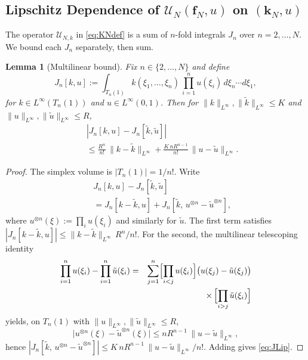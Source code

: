 \documentclass[10pt,a4paper]{amsart}
\newcommand{\Linf}{L^\infty}
\newtheorem{lemma}{Lemma}
\begin{document}
\subsection{Lipschitz Dependence of $\mathcal{U}_N(\mathbf{f}_N, u)$ on $(\mathbf{k}_N, u)$}
\label{sec:UNlip}

The operator $\mathcal{U}_{N,k}$ in \eqref{eq:KNdef} is a sum of $n$-fold integrals $J_n$ over $n = 2, \ldots, N$. We bound each $J_n$ separately, then sum.

\begin{lemma}[Multilinear bound]
\label{lem:single-order}
Fix $n\in\{2,\ldots,N\}$ and define
\begin{equation}
J_n[k,u] := \int_{T_n(1)} k(\xi_1,\ldots,\xi_n)\,\prod_{i=1}^n u(\xi_i)\,d\xi_n\cdots d\xi_1,
\label{eq:Jdef}
\end{equation}
for $k\in\Linf(T_n(1))$ and $u\in\Linf(0,1)$. Then for $\|k\|_{\Linf},\|\tilde k\|_{\Linf}\le K$ and $\|u\|_{\Linf},\|\tilde u\|_{\Linf}\le R$,
\begin{eqnarray}
&& |J_n[k,u] - J_n[\tilde k,\tilde u]| \nonumber \\
&& \le \frac{R^n}{n!}\,\|k-\tilde k\|_{\Linf}
+ \frac{K\,n R^{n-1}}{n!}\,\|u-\tilde u\|_{\Linf}.
\label{eq:JLip}
\end{eqnarray}
\end{lemma}

\begin{proof}
The simplex volume is $|T_n(1)| = 1/n!$. Write
\begin{eqnarray}
&& J_n[k,u] - J_n[\tilde k,\tilde u] \nonumber \\
&& = J_n[k-\tilde k,u] + J_n[\tilde k,\,u^{\otimes n} - \tilde u^{\otimes n}],
\label{eq:Jdiff-split}
\end{eqnarray}
where $u^{\otimes n}(\xi) := \prod_i u(\xi_i)$ and similarly for $\tilde u$. The first term satisfies $|J_n[k-\tilde k,u]| \le \|k-\tilde k\|_{\Linf}\,R^n / n!$. For the second, the multilinear telescoping identity
\begin{eqnarray}
\prod_{i=1}^n u(\xi_i) - \prod_{i=1}^n \tilde u(\xi_i) &=& \sum_{j=1}^n \Bigl[\prod_{i<j} u(\xi_i)\Bigr]\bigl(u(\xi_j) - \tilde u(\xi_j)\bigr) \nonumber \\
&& \times\, \Bigl[\prod_{i>j}\tilde u(\xi_i)\Bigr]
\label{eq:telescope}
\end{eqnarray}
yields, on $T_n(1)$ with $\|u\|_{\Linf},\|\tilde u\|_{\Linf}\le R$,
\begin{equation}
\bigl|u^{\otimes n}(\xi) - \tilde u^{\otimes n}(\xi)\bigr|
\le n R^{n-1}\,\|u-\tilde u\|_{\Linf},
\label{eq:tensor-diff}
\end{equation}
hence $|J_n[\tilde k,\,u^{\otimes n} - \tilde u^{\otimes n}]| \le K\,n R^{n-1}\,\|u-\tilde u\|_{\Linf} / n!$. Adding gives \eqref{eq:JLip}.
\end{proof}
\end{document}
